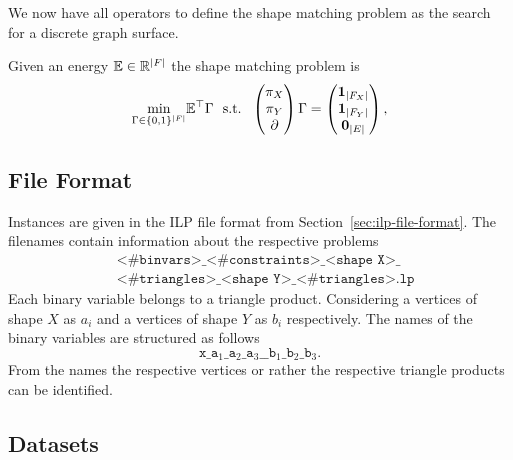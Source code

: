 We now have all operators to define the shape matching problem as the search for a discrete graph surface.
\begin{definition}
	Given an energy $\mathbb{E} \in \mathbb{R}^{\lvert F\rvert}$ the shape matching problem is
	\begin{equation} 
		\underset{\Gamma \in \{0, 1\}^{|F|}}{\min} \mathbb{E}^\top  \Gamma  
		~~  \text{s.t.} ~~
		\begin{pmatrix}
			\pi_X \\ \pi_Y \\ \partial
		\end{pmatrix}
		\Gamma
		= 
		\begin{pmatrix}
			\boldsymbol{1}_{|F_X|} \\ \boldsymbol{1}_{|F_Y|} \\ \boldsymbol{0}_{\lvert E\rvert} \\
		\end{pmatrix},
		\label{eq:shape-matching-opt}
	\end{equation}
\end{definition}

\subsection{File Format}
Instances are given in the ILP file format from Section~\ref{sec:ilp-file-format}. The filenames contain information about the respective problems
\begin{equation}
	\begin{aligned}
	&\texttt{<\# binvars>\_<\# constraints>\_<shape X>\_} \\
	&\texttt{<\# triangles>\_<shape Y>\_<\#  triangles>.lp}
	\end{aligned}
\end{equation}
Each binary variable belongs to a triangle product. Considering a vertices of shape $X$ as $a_i$ and a vertices of shape $Y$ as $b_i$ respectively. The names of the binary variables are structured as follows 
\begin{equation}
	\texttt{x} \_ \texttt{a}_1 \_ \texttt{a}_2 \_ \texttt{a}_3 \_\_ \texttt{b}_1 \_ \texttt{b}_2 \_ \texttt{b}_3.
\end{equation}
From the names the respective vertices or rather the respective triangle products can be identified.


\subsection{Datasets}
